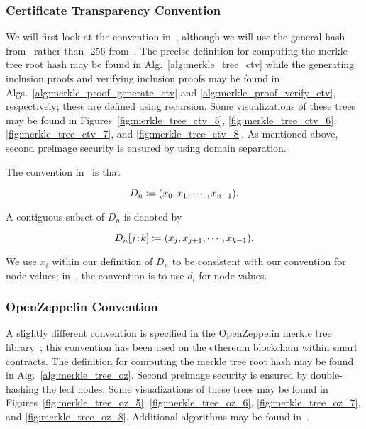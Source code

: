 \subsubsection{Certificate Transparency Convention}

We will first look at the convention in~\cite{rfc6962,rfc9162},
although we will use the general hash from~\cite{rfc9162}
rather than \ShaTwo{}-256 from~\cite{rfc6962}.
The precise definition for computing the \gls{merkle tree}
root hash may be found in Alg.~\ref{alg:merkle_tree_ctv}
while the generating inclusion proofs
and verifying inclusion proofs may be found in
Algs.~\ref{alg:merkle_proof_generate_ctv}
and \ref{alg:merkle_proof_verify_ctv}, respectively;
these are defined using \gls{recursion}.
Some visualizations of these trees may be found in
Figures~\ref{fig:merkle_tree_ctv_5},
\ref{fig:merkle_tree_ctv_6},
\ref{fig:merkle_tree_ctv_7}, and
\ref{fig:merkle_tree_ctv_8}.
As mentioned above, second preimage security is ensured by
using domain separation.

The convention in~\cite{rfc9162} is that

\begin{equation}
    D_{n} \coloneqq{} (x_{0}, x_{1}, \cdots, x_{n-1}).
\end{equation}

\noindent
A contiguous subset of $D_{n}$ is denoted by

\begin{equation}
    D_{n}[j\!:\!k] \coloneqq{} (x_{j}, x_{j+1}, \cdots, x_{k-1}).
\end{equation}

\noindent
We use $x_{i}$ within our definition of $D_{n}$
to be consistent with our convention for node values;
in~\cite{rfc9162}, the convention is to use $d_{i}$ for node values.





\subsubsection{OpenZeppelin Convention}

A slightly different convention is specified in the OpenZeppelin
\gls{merkle tree} library~\cite{MerkleTreeOZ};
this convention has been used on the \gls{ethereum} blockchain
within \glspl{smart contract}.
The definition for computing the \gls{merkle tree}
root hash may be found in Alg.~\ref{alg:merkle_tree_oz}.
Second preimage security is ensured by double-hashing the leaf nodes.
Some visualizations of these trees may be found in
Figures~\ref{fig:merkle_tree_oz_5},
\ref{fig:merkle_tree_oz_6},
\ref{fig:merkle_tree_oz_7}, and
\ref{fig:merkle_tree_oz_8}.
Additional algorithms may be found in~\cite{MerkleTreeOZ}.


